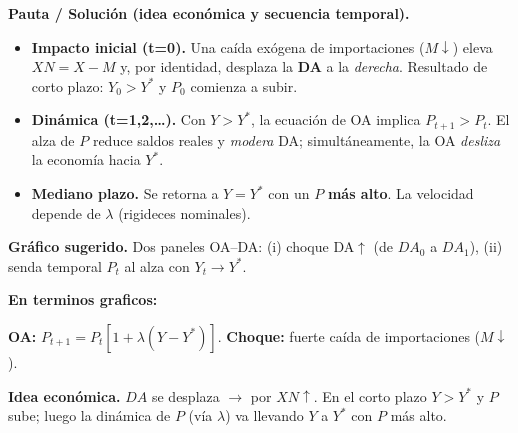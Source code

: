 \documentclass[11pt,addpoints]{article}
\begin{document}
\textbf{Pauta / Solución (idea económica y secuencia temporal).}
\begin{itemize}
\item \textbf{Impacto inicial (t=0).} Una caída exógena de importaciones (\(M\downarrow\)) eleva \(XN=X-M\) y, por identidad, desplaza la \textbf{DA} a la \emph{derecha}. Resultado de corto plazo: \(Y_0>Y^*\) y \(P_0\) comienza a subir.
\item \textbf{Dinámica (t=1,2,\dots).} Con \(Y>Y^*\), la ecuación de OA implica \(P_{t+1}>P_t\). El alza de \(P\) reduce saldos reales y \emph{modera} DA; simultáneamente, la OA \emph{desliza} la economía hacia \(Y^*\).
\item \textbf{Mediano plazo.} Se retorna a \(\boxed{Y=Y^*}\) con un \(\boxed{P}\) \textbf{más alto}. La velocidad depende de \(\lambda\) (rigideces nominales).

\end{itemize}

\textbf{Gráfico sugerido.} Dos paneles OA--DA: (i) choque DA\(\uparrow\) (de \(DA_0\) a \(DA_1\)), (ii) senda temporal \(P_t\) al alza con \(Y_t\to Y^*\).

\newpage
\vspace*{0.1cm}
\textbf{En terminos graficos:}

\textbf{OA: } \(P_{t+1}=P_t[1+\lambda(Y-Y^*)]\). \textbf{Choque:} fuerte caída de importaciones (\(M\downarrow\)).

\textbf{Idea económica.} \(DA\) se desplaza \(\rightarrow\) por \(XN\uparrow\). En el corto plazo \(Y>Y^*\) y \(P\) sube; luego la dinámica de \(P\) (vía \(\lambda\)) va llevando \(Y\) a \(Y^*\) con \(P\) más alto.
\end{document}

